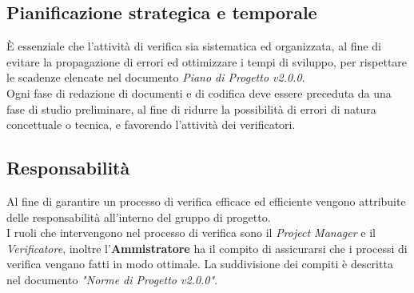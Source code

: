 \documentclass[12pt,a4paper,titlepage]{article}
\begin{document}
	\subsection{Pianificazione strategica e temporale}
	È essenziale che l'attività di verifica sia sistematica ed organizzata, al fine di evitare la propagazione di errori ed ottimizzare i tempi di sviluppo, per rispettare le scadenze elencate nel documento \textit{Piano di Progetto v2.0.0}.\\
	Ogni fase di redazione di documenti e di codifica deve essere preceduta da una fase di studio preliminare, al fine di ridurre la possibilità di errori di natura concettuale o tecnica, e favorendo l'attività dei verificatori.\\
	
	\subsection{Responsabilità}
	Al fine di garantire un processo di verifica efficace ed efficiente vengono attribuite delle responsabilità all'interno del gruppo di progetto.\\
	I ruoli che intervengono nel processo di verifica sono il \textit{Project Manager} e il \textit{Verificatore}, inoltre l'\textbf{Ammistratore} ha il compito di assicurarsi che i processi di verifica vengano fatti in modo ottimale. La suddivisione dei compiti è descritta nel documento \textit{"Norme di Progetto v2.0.0"}.
	
\end{document}
